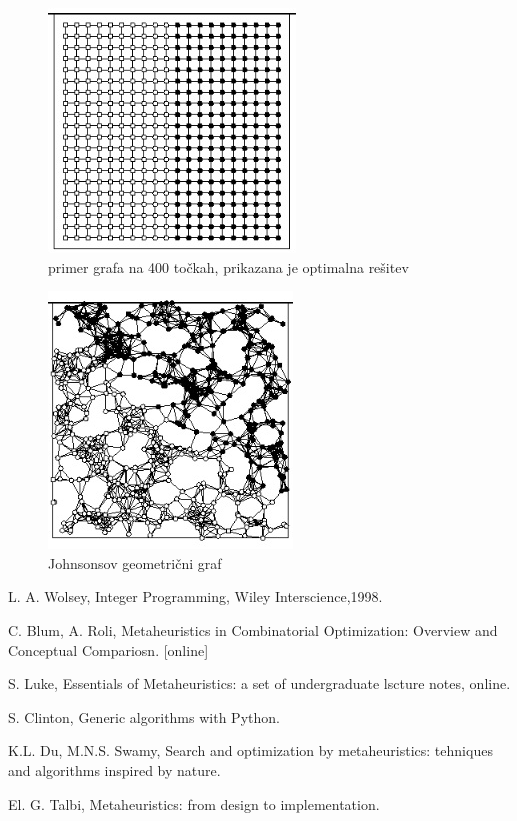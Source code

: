 \documentclass[12pt,a4paper]{amsart}
\theoremstyle{definition} %
\theoremstyle{plain} %
\begin{document}
\begin{figure}[h]
    \centering
    \includegraphics{drugi_graf} 
    \caption{primer grafa na 400 točkah, prikazana je optimalna rešitev}
    \label{fig:2_graf}
\end{figure}

\begin{figure}[h]
    \centering
    \includegraphics{tretji_graf} 
    \caption{Johnsonsov geometrični graf}
    \label{fig:3_graf}
\end{figure}

\newpage

\begin{thebibliography}{9}
L. A. Wolsey, Integer Programming, Wiley Interscience,1998. 

 
C. Blum, A. Roli, Metaheuristics in Combinatorial Optimization: Overview and Conceptual Compariosn. [online]
 
S. Luke, Essentials of Metaheuristics: a set of undergraduate lscture notes, online. 

S. Clinton, Generic algorithms with Python.

K.L. Du, M.N.S. Swamy, Search and optimization by metaheuristics: tehniques and algorithms inspired by nature. 


El. G. Talbi, Metaheuristics: from design to implementation.

\end{thebibliography}
\end{document}

